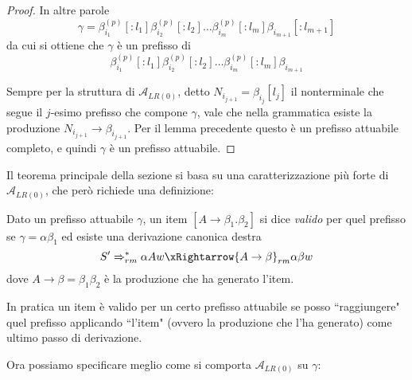 \documentclass[12pt]{article}
\numberwithin{theorem}{subsection}
\begin{document}
\begin{proof}
	In altre parole
	\[
	\gamma = \beta_{i_1}^{(p)}[:l_1] \beta_{i_2}^{(p)}[:l_2] \dots \beta_{i_m}^{(p)}[:l_m] \beta_{i_{m+1}}[:l_{m+1}]
	\]
	da cui si ottiene che $\gamma$ è un prefisso di
	\[
	\beta_{i_1}^{(p)}[:l_1] \beta_{i_2}^{(p)}[:l_2] \dots \beta_{i_m}^{(p)}[:l_m] \beta_{i_{m+1}}
	\]
	
	Sempre per la struttura di $\mathcal{A}_{LR(0)}$, detto $N_{i_{j + 1}} = \beta_{i_j}[l_j]$ il nonterminale che segue il $j$-esimo prefisso che compone $\gamma$, vale che nella grammatica esiste la produzione $N_{i_{j + 1}} \rightarrow \beta_{i_{j+1}}$. Per il lemma precedente questo è un prefisso attuabile completo, e quindi $\gamma$ è un prefisso attuabile.
\end{proof}

Il teorema principale della sezione si basa su una caratterizzazione più forte di $\mathcal{A}_{LR(0)}$, che però richiede una definizione:
\begin{definition}
	Dato un prefisso attuabile $\gamma$, un item $[ A \rightarrow \beta_1 . \beta_2 ]$ si dice \textit{valido} per quel prefisso se $\gamma = \alpha \beta_1$ ed esiste una derivazione canonica destra
	\[
	S' \Rightarrow_{rm}^* \alpha A w \xRightarrow{A \rightarrow \beta}_{rm} \alpha \beta w
	\]
	dove $A \rightarrow \beta = \beta_1 \beta_2$ è la produzione che ha generato l'item.
\end{definition}

In pratica un item è valido per un certo prefisso attuabile se posso ``raggiungere" quel prefisso applicando ``l'item" (ovvero la produzione che l'ha generato) come ultimo passo di derivazione.

Ora possiamo specificare meglio come si comporta $\mathcal{A}_{LR(0)}$ su $\gamma$:
\end{document}
